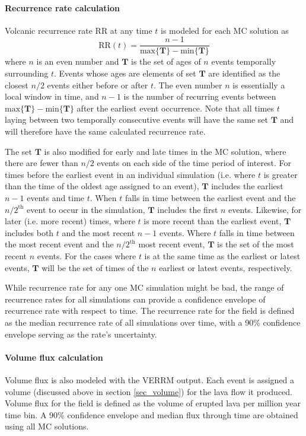 \documentclass[12pt,letter]{article}
\begin{document}
\paragraph{Recurrence rate calculation} Volcanic recurrence rate RR at any time $t$ is modeled for each MC solution as
\begin{equation}
\text{RR}(t) = \frac{n-1}{\text{max}\{\mathbf{T}\} - \text{min}\{\mathbf{T}\}}
\label{eq_RR}
\end{equation}
where $n$ is an even number and $\mathbf{T}$ is the set of ages of $n$ events temporally surrounding $t$. Events whose ages are elements of set $\mathbf{T}$ are identified as the closest $n/2$ events either before or after $t$. The even number $n$ is essentially a local window in time, and $n-1$ is the number of recurring events between $\text{max}\{\mathbf{T}\}-\text{min}\{\mathbf{T}\}$ after the earliest event occurrence. Note that all times $t$ laying between two temporally consecutive events will have the same set $\mathbf{T}$ and will therefore have the same calculated recurrence rate.

The set $\mathbf{T}$ is also modified for early and late times in the MC solution, where there are fewer than $n/2$ events on each side of the time period of interest. For times before the earliest event in an individual simulation (i.e. where $t$ is greater than the time of the oldest age assigned to an event), $\mathbf{T}$ includes the earliest $n-1$ events and time $t$. When $t$ falls in time between the earliest event and the $n/2^{\text{th}}$ event to occur in the simulation, $\mathbf{T}$ includes the first $n$ events. Likewise, for later (i.e. more recent) times, where $t$ is more recent than the earliest event, $\mathbf{T}$ includes both $t$ and the most recent $n-1$ events. Where $t$ falls in time between the most recent event and the $n/2^{\text{th}}$ most recent event, $\mathbf{T}$ is the set of the most recent $n$ events. For the cases where $t$ is at the same time as the earliest or latest events, $\mathbf{T}$ will be the set of times of the $n$ earliest or latest events, respectively.

While recurrence rate for any one MC simulation might be bad, the range of recurrence rates for all simulations can provide a confidence envelope of recurrence rate with respect to time. The recurrence rate for the field is defined as the median recurrence rate of all simulations over time, with a 90\% confidence envelope serving as the rate's uncertainty.

\paragraph{Volume flux calculation} Volume flux is also modeled with the VERRM output. Each event is assigned a volume (discussed above in section \ref{sec_volume}) for the lava flow it produced. Volume flux for the field is defined as the volume of erupted lava per million year time bin. A 90\% confidence envelope and median flux through time are obtained using all MC solutions.
\end{document}
